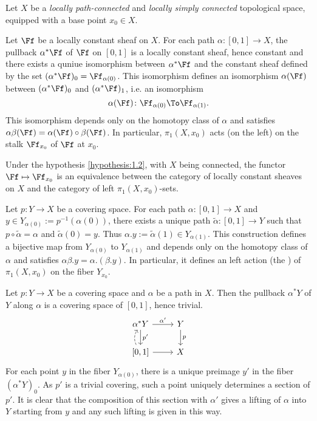 \begin{para}\label{hypothesis:1.2}
  Let $X$ be a \emph{locally path-connected} and
  \emph{locally simply connected}
  topological space, equipped with a base point $x_0\in X$.

  Let $\Ff$ be a locally constant sheaf on $X$.
  For each path $\alpha\colon[0,1]\to X$, the pullback $\alpha^{\ast}\Ff$
  of $\Ff$ on $[0,1]$ is a locally constant sheaf, hence constant and there
  exists a quniue isomorphism between $\alpha^{\ast}\Ff$ and the constant
  sheaf defined by the set $(\alpha^{\ast}\Ff)_0 = \Ff_{\alpha(0)}$.
  This isomorphism defines an isomorphism $\alpha(\Ff)$ between
  $(\alpha^{\ast}\Ff)_0$ and $(\alpha^{\ast}\Ff)_1$, i.e. an isomorphism
  \[
    \alpha(\Ff)\colon \Ff_{\alpha(0)}\To\Ff_{\alpha(1)}.
  \]
  This isomorphism depends only on the homotopy class of $\alpha$ and satisfies
  $\alpha\beta(\Ff)=\alpha(\Ff)\circ\beta(\Ff)$.
  In particular, $\pi_1(X,x_0)$ acts (on the left) on the stalk $\Ff_{x_0}$ of
  $\Ff$ at $x_0$.
\end{para}

\begin{proposition}\label{prop:equivalence_monodromy}
  Under the hypothesis \ref{hypothesis:1.2}, with $X$ being connected,
  the functor $\Ff\mapsto\Ff_{x_0}$ is an equivalence between
  the category of locally constant sheaves on $X$ and
  the category of left $\pi_1(X,x_0)$-sets.
\end{proposition}

\begin{subpara}\label{def:monodromy_action}
  Let $p\colon Y\to X$ be a covering space.
  For each path $\alpha\colon[0,1]\to X$ and
  $y\in Y_{\alpha(0)}:=p^{-1}(\alpha(0))$,
  there exists a unique path $\widetilde{\alpha}\colon[0,1]\to Y$ such that
  $p\circ\widetilde{\alpha}=\alpha$ and $\widetilde{\alpha}(0)=y$.
  Thus $\alpha.y:=\widetilde{\alpha}(1)\in Y_{\alpha(1)}$.
  This construction defines a bijective map from $Y_{\alpha(0)}$
  to $Y_{\alpha(1)}$ and depends only on the homotopy class of $\alpha$
  and satisfies $\alpha\beta.y=\alpha.(\beta.y)$.
  In particular, it defines an left action (the )
  of $\pi_1(X,x_0)$ on the fiber $Y_{x_0}$.
\end{subpara}

\begin{Remark}
  Let $p\colon Y\to X$ be a covering space and $\alpha$ be a path in $X$.
  Then the pullback $\alpha^{\ast}Y$ of $Y$ along $\alpha$ is a covering space
  of $[0,1]$, hence trivial.
  \[
  \begin{tikzcd}
    \alpha^{\ast}Y\ar[r,"{\alpha'}"]\ar[d,"{p'}"] & Y\ar[d,"p"]\\
    {[0,1]}\ar[r]\ar[u,bend left,dashed] & X
  \end{tikzcd}
  \]
  For each point $y$ in the fiber $Y_{\alpha(0)}$,
  there is a unique preimage $y'$ in the fiber $(\alpha^{\ast}Y)_0$.
  As $p'$ is a trivial covering, such a point uniquely determines a section of
  $p'$. It is clear that the composition of this section with $\alpha'$ gives
  a lifting of $\alpha$ into $Y$ starting from $y$ and any such lifting is given
  in this way.
\end{Remark}


